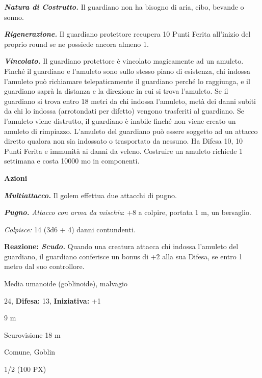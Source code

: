\begin{multicols}{2}
{\emph{\textbf{Natura di Costrutto.}} Il guardiano non ha bisogno di aria, cibo, bevande o sonno.

\emph{\textbf{Rigenerazione.}} Il guardiano protettore recupera 10 Punti Ferita all'inizio del proprio round se ne possiede ancora almeno 1.

\emph{\textbf{Vincolato.}} Il guardiano protettore è vincolato magicamente ad un amuleto. Finché il guardiano e l'amuleto sono sullo stesso piano di esistenza, chi indossa l'amuleto può richiamare telepaticamente il guardiano perché lo raggiunga, e il guardiano saprà la distanza e la direzione in cui si trova l'amuleto. Se il guardiano si trova entro 18 metri da chi indossa l'amuleto, metà dei danni subiti da chi lo indossa (arrotondati per difetto) vengono trasferiti al guardiano. Se l'amuleto viene distrutto, il guardiano è inabile finché non viene creato un amuleto di rimpiazzo. L'amuleto del guardiano può essere soggetto ad un attacco diretto qualora non sia indossato o trasportato da nessuno. Ha Difesa 10, 10 Punti Ferita e immunità ai danni da veleno. Costruire un amuleto richiede 1 settimana e costa 10000 mo in componenti.

\textbf{Azioni}

\emph{\textbf{Multiattacco.}} Il golem effettua due attacchi di pugno.

\emph{\textbf{Pugno.} Attacco con arma da mischia}: +8 a colpire, portata 1 m, un bersaglio.

\emph{Colpisce:} 14 (3d6 + 4) danni contundenti.

\textbf{Reazione: \emph{Scudo.}} Quando una creatura attacca chi indossa l'amuleto del guardiano, il guardiano conferisce un bonus di +2 alla sua Difesa, se entro 1 metro dal suo controllore.


\noindent
\begin{description}[noitemsep, topsep=0pt, parsep=0pt, partopsep=0pt, leftmargin=0cm, labelwidth=2.2cm]
	\item[\textbf{Taglia/Tipo:}] Media umanoide (goblinoide), malvagio
	\item[\textbf{Caratt.:}] 
	\item[\textbf{Punti Ferita:}] 24,  \textbf{Difesa:} 13,  \textbf{Iniziativa:} +1
	\item[\textbf{Movimento:}] 9 m
	\item[\textbf{Tiri Salvez.:}] 
	\item[\textbf{Sensi:}] Scurovisione 18 m
	\item[\textbf{Linguaggi:}] Comune, Goblin
	\item[\textbf{Sfida:}] 1/2 (100 PX)\smallskip
\end{description}

}
\end{multicols}
